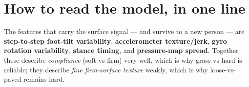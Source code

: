 \documentclass[11pt]{article}
\begin{document}
\section*{How to read the model, in one line}
The features that carry the surface signal --- and survive to a new person --- are
\textbf{step-to-step foot-tilt variability}, \textbf{accelerometer texture/jerk}, \textbf{gyro
rotation variability}, \textbf{stance timing}, and \textbf{pressure-map spread}. Together these
describe \emph{compliance} (soft vs firm) very well, which is why grass-vs-hard is reliable; they
describe \emph{fine firm-surface texture} weakly, which is why loose-vs-paved remains hard.
\end{document}
